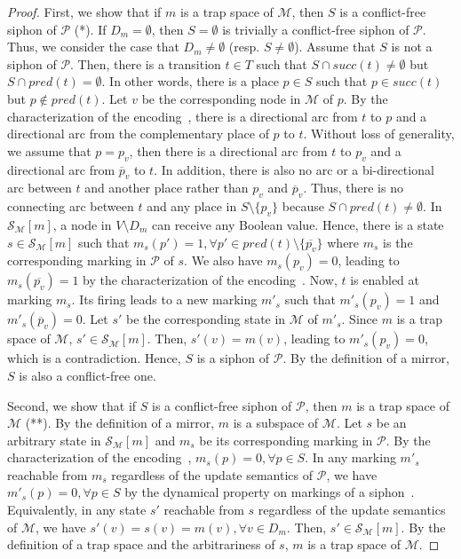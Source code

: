 \documentclass[runningheads]{llncs}
\begin{document}
\begin{proof}

  First, we show that if \(m\) is a trap space of \(\mathcal{M}\), then \(S\) is a conflict-free siphon of \(\mathcal{P}\) (*). If \(D_m = \emptyset\), then \(S = \emptyset\) is trivially a conflict-free siphon of \(\mathcal{P}\). Thus, we consider the case that \(D_m \neq \emptyset\) (resp. \(S \neq \emptyset\)). Assume that \(S\) is not a siphon of \(\mathcal{P}\). Then, there is a transition \(t \in T\) such that \(S\cap succ(t)\not =\emptyset\) but \(S\cap pred(t)=\emptyset\). In other words, there is a place \(p \in S\) such that \(p \in succ(t)\) but \(p \not \in pred(t)\). Let \(v\) be the corresponding node in \(\mathcal{M}\) of \(p\). By the characterization of the encoding~\cite{chaouiya2004qualitative}, there is a directional arc from \(t\) to \(p\) and a directional arc from the complementary place of \(p\) to \(t\). Without loss of generality, we assume that \(p = p_v\), then there is a directional arc from \(t\) to \(p_v\) and a directional arc from \(\overline{p}_v\) to \(t\). In addition, there is also no arc or a bi-directional arc between \(t\) and another place rather than \(p_v\) and \(\overline{p}_v\). Thus, there is no connecting arc between \(t\) and any place in \(S \setminus \{p_v\}\) because \(S\cap pred(t)\not =\emptyset\). In \(\mathcal{S}_{\mathcal{M}}[m]\), a node in \(V \setminus D_m\) can receive any Boolean value. Hence, there is a state \(s \in \mathcal{S}_{\mathcal{M}}[m]\) such that \(m_s(p') = 1, \forall p' \in pred(t) \setminus \{\overline{p_v}\}\) where \(m_s\) is the corresponding marking in \(\mathcal{P}\) of \(s\). We also have \(m_s(p_v) = 0\), leading to \(m_s(\overline{p_v}) = 1\) by the characterization of the encoding~\cite{chaouiya2004qualitative}. Now, \(t\) is enabled at marking \(m_s\). Its firing leads to a new marking \(m'_s\) such that \(m'_s(p_v) = 1\) and \(m'_s(\overline{p}_v) = 0\). Let \(s'\) be the corresponding state in \(\mathcal{M}\) of \(m'_s\). Since \(m\) is a trap space of \(\mathcal{M}\), \(s' \in \mathcal{S}_{\mathcal{M}}[m]\). Then, \(s'(v) = m(v)\), leading to \(m'_s(p_v) = 0\), which is a contradiction. Hence, \(S\) is a siphon of \(\mathcal{P}\). By the definition of a mirror, \(S\) is also a conflict-free one.
  
  Second, we show that if \(S\) is a conflict-free siphon of \(\mathcal{P}\), then \(m\) is a trap space of \(\mathcal{M}\) (**). By the definition of a mirror, \(m\) is a subspace of \(\mathcal{M}\). Let \(s\) be an arbitrary state in \(\mathcal{S}_{\mathcal{M}}[m]\) and \(m_s\) be its corresponding marking in \(\mathcal{P}\). By the characterization of the encoding~\cite{chaouiya2004qualitative}, \(m_s(p) = 0, \forall p \in S\). In any marking \(m'_s\) reachable from \(m_s\) regardless of the update semantics of \(\mathcal{P}\), we have \(m'_s(p) = 0, \forall p \in S\) by the dynamical property on markings of a siphon~\cite{DBLP:journals/isci/LiuB16}. Equivalently, in any state \(s'\) reachable from \(s\) regardless of the update semantics of \(\mathcal{M}\), we have \(s'(v) = s(v) = m(v), \forall v \in D_m\). Then, \(s' \in \mathcal{S}_{\mathcal{M}}[m]\). By the definition of a trap space and the arbitrariness of \(s\), \(m\) is a trap space of \(\mathcal{M}\).
  

\end{proof}
\end{document}

